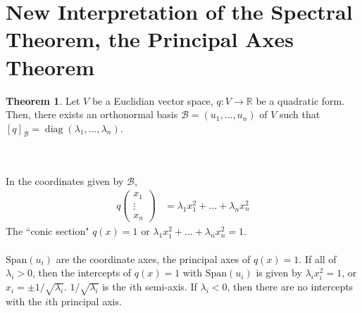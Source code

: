 \documentclass[letterpaper,12pt]{article}
\theoremstyle{definition}
\newtheorem*{theorem}{Theorem}
\newcommand{\Span}[1]{\text{Span}\left(#1 \right)}
\begin{document}
\section*{New Interpretation of the Spectral Theorem, the Principal Axes Theorem}
\begin{theorem}
Let $V$ be a Euclidian vector space, $q: V \rightarrow \mathbb{R}$ be a quadratic form. Then, there exists an orthonormal basis $\mathcal{B} = (u_1, \dots, u_n)$ of $V$ such that $[q]_{\mathcal{B}} = \operatorname{diag}(\lambda_1, \dots, \lambda_n)$.
\end{theorem}
\\ \\ In the coordinates given by $\mathcal{B}$,
\begin{align*}
    q \begin{pmatrix} x_1 \\ \vdots \\ x_n \end{pmatrix} & = \lambda_1 x_{1}^{2} + \dots + \lambda_n x_{n}^{2}
\end{align*}
The ``conic section" $q(x) = 1$ or $\lambda_1 x_{1}^{2} + \dots + \lambda_n x_{n}^{2} = 1$.
\\ \\ $\Span{u_i}$ are the coordinate axes, the principal axes of $q(x) = 1$. If all of $\lambda_i > 0$, then the intercepts of $q(x) = 1$ with $\Span{u_i}$ is given by $\lambda_i x_{i}^{2} = 1$, or $x_i = \pm 1/\sqrt{\lambda_i}$. $1/\sqrt{\lambda_i}$ is the $i$th semi-axis. If $\lambda_i < 0$, then there are no intercepts with the $i$th principal axis.
\end{document}
